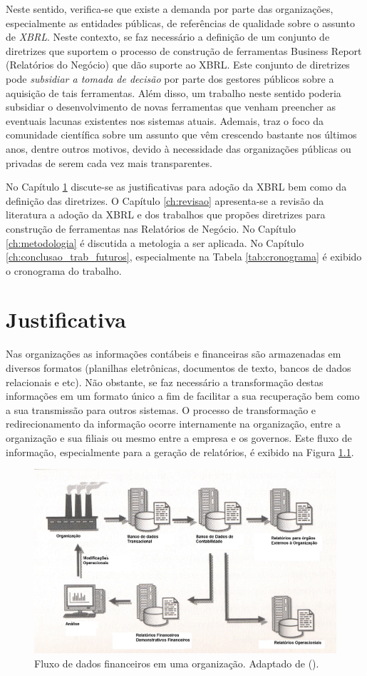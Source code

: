 \documentclass[msc,proposal,hidelot,hideabstract]{ppgccufmg} %
\begin{document}
Neste sentido, verifica-se que existe a demanda por parte das organizações,
especialmente as entidades públicas, de referências de qualidade sobre o
assunto de \textit{XBRL}. Neste contexto, se faz necessário a definição de um
conjunto de diretrizes que suportem o processo de construção de ferramentas
Business Report (Relatórios do Negócio)  que dão suporte ao XBRL. Este
conjunto de diretrizes pode \textit{subsidiar a tomada de decisão} por parte
dos gestores públicos sobre a aquisição de tais ferramentas.
Além disso, um trabalho neste sentido poderia subsidiar o desenvolvimento de novas ferramentas que venham preencher as eventuais lacunas existentes nos sistemas atuais. Ademais, traz o foco da comunidade científica sobre um assunto que vêm crescendo bastante nos últimos anos, dentre outros motivos, devido à necessidade das organizações públicas ou privadas de serem cada vez mais transparentes.


No Capítulo \ref{ch:justificativa} discute-se as justificativas para adoção da
XBRL bem como da definição das diretrizes. O Capítulo \ref{ch:revisao}
apresenta-se a revisão da literatura a adoção da XBRL e dos trabalhos que
propões diretrizes para construção de ferramentas nas Relatórios de Negócio. No
Capítulo \ref{ch:metodologia} é discutida a metologia a ser aplicada. No
Capítulo \ref{ch:conclusao_trab_futuros}, especialmente na Tabela \ref{tab:cronograma} é exibido o cronograma do trabalho.

\chapter{Justificativa}
\label{ch:justificativa}

Nas organizações as informações contábeis e financeiras são armazenadas em
diversos formatos (planilhas eletrônicas, documentos de texto, bancos de dados
relacionais e etc).
Não obstante, se faz necessário a transformação destas informações em um
formato único a fim de facilitar a sua recuperação bem como a sua transmissão
para outros sistemas.
 O processo de transformação e redirecionamento da informação ocorre internamente na organização, entre a organização e sua filiais ou mesmo entre a empresa e os governos. Este fluxo de informação, especialmente para a geração de relatórios, é exibido na Figura \ref{fig:fluxo_dados}.

\begin{figure}[hbtp]
\centering
\includegraphics[width=.75\textwidth]{img/fluxo_informacoes.png}
\caption{Fluxo de dados financeiros em uma organização. Adaptado de (\cite{bergeron2004essentials}).}
\label{fig:fluxo_dados}
\end{figure}
\end{document}
